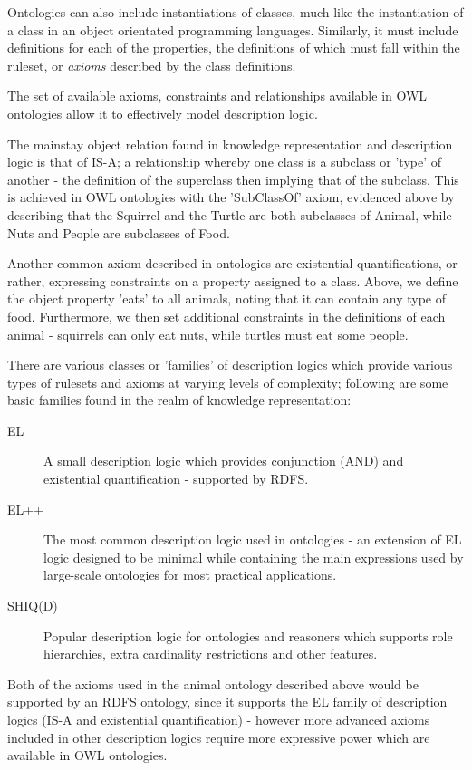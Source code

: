 \documentclass{article}
\begin{document}
Ontologies can also include instantiations of classes, much like the
instantiation of a class in an object orientated programming languages.
Similarly, it must include definitions for each of the properties, the
definitions of which must fall within the ruleset, or \emph{axioms} 
described by the class definitions.

The set of available axioms, constraints and relationships available in OWL
ontologies allow it to effectively model description logic\cite{desclogic}. 

The mainstay object relation found in knowledge representation and description
logic is that of IS-A; a relationship whereby one class is a subclass or 'type'
of another - the definition of the superclass then implying that of the
subclass. This is achieved in OWL ontologies with the 'SubClassOf' axiom,
evidenced above by describing that the Squirrel and the Turtle are both
subclasses of Animal, while Nuts and People are subclasses of Food.

Another common axiom described in ontologies are existential quantifications, or
rather, expressing constraints on a property assigned to a class. Above, we
define the object property 'eats' to all animals, noting that it can contain any
type of food. Furthermore, we then set additional constraints in the definitions
of each animal - squirrels can only eat nuts, while turtles must eat some
people.

There are various classes or 'families' of description logics which provide various 
types of rulesets and axioms at varying levels of complexity; following are some basic 
families found in the realm of knowledge representation:

\begin{description}
    \item[EL] A small description logic which provides conjunction (AND) and
    existential quantification - supported by RDFS.\cite{rdfs}
    \item[EL++] The most common description logic used in ontologies - an
    extension of EL logic designed to be minimal while containing the main 
    expressions used by large-scale ontologies for most practical 
    applications.\cite{elplusplus}
    \item[SHIQ(D)] Popular description logic for ontologies and reasoners which
    supports role hierarchies, extra cardinality restrictions and other
    features.\cite{shiq}
\end{description}

Both of the axioms used in the animal ontology described above would be
supported by an RDFS ontology, since it supports the EL family of description
logics (IS-A and existential quantification) - however more advanced axioms
included in other description logics require more expressive power which are
available in OWL ontologies.
\end{document}
